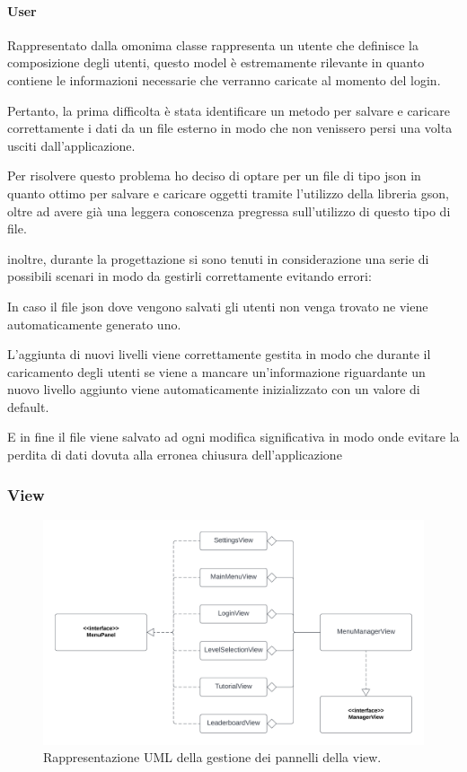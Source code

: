 \documentclass[a4paper,12pt]{report}
\begin{document}
\paragraph{User} Rappresentato dalla omonima classe rappresenta un utente che definisce la composizione degli utenti, questo model è estremamente rilevante in quanto contiene le informazioni necessarie che verranno caricate al momento del login. 

Pertanto, la prima difficolta è stata identificare un metodo per salvare e caricare correttamente i dati da un file esterno in modo che non venissero persi una volta usciti dall’applicazione. 

Per risolvere questo problema ho deciso di optare per un file di tipo json in quanto ottimo per salvare e caricare oggetti tramite l’utilizzo della libreria gson, oltre ad avere già una leggera conoscenza pregressa sull’utilizzo di questo tipo di file. 

inoltre, durante la progettazione si sono tenuti in considerazione una serie di possibili scenari in modo da gestirli correttamente evitando errori: 

In caso il file json dove vengono salvati gli utenti non venga trovato ne viene automaticamente generato uno. 

L’aggiunta di nuovi livelli viene correttamente gestita in modo che durante il caricamento degli utenti se viene a mancare un’informazione riguardante un nuovo livello aggiunto viene automaticamente inizializzato con un valore di default. 

E in fine il file viene salvato ad ogni modifica significativa in modo onde evitare la perdita di dati dovuta alla erronea chiusura dell’applicazione 


\subsubsection{View}

\begin{figure}[H]
\centering{}
\includegraphics[scale=0.7] {img/view-manager.png}
\caption{Rappresentazione UML della gestione dei pannelli della view.}
\label{img:view-manager}
\end{figure}
\end{document}
